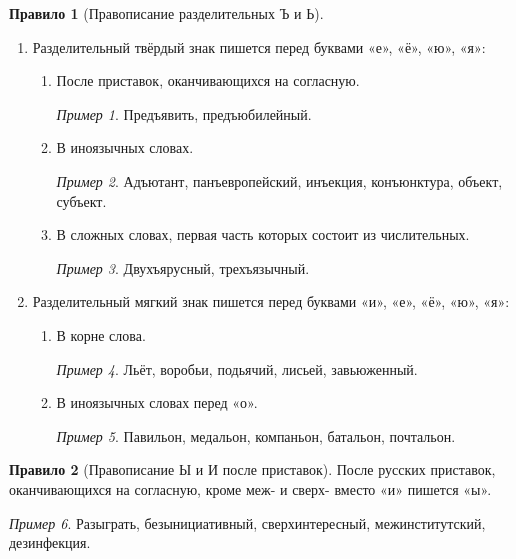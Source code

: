\documentclass[12pt]{article}
\theoremstyle{definition}
\newtheorem{rrule}{Правило}[section]
\theoremstyle{remark}
\newtheorem*{example}{Пример}
\begin{document}
\begin{rrule}[Правописание разделительных Ъ и Ь]
    \hfill
    \begin{enumerate}
        \item Разделительный твёрдый знак пишется перед буквами «е», «ё», «ю», «я»:
        \begin{enumerate}
            \item После приставок, оканчивающихся на согласную.
            \begin{example}
                Предъявить, предъюбилейный.
            \end{example}
            \item В иноязычных словах.
            \begin{example}
                Адъютант, панъевропейский, инъекция, конъюнктура, объект, субъект.
            \end{example}
            \item В сложных словах, первая часть которых состоит из числительных.
            \begin{example}
                Двухъярусный, трехъязычный.
            \end{example}
        \end{enumerate}
        \item Разделительный мягкий знак пишется перед буквами «и», «е», «ё», «ю», «я»:
        \begin{enumerate}
            \item В корне слова.
            \begin{example}
                Льёт, воробьи, подьячий, лисьей, завьюженный.
            \end{example}
            \item В иноязычных словах перед «о».
            \begin{example}
                Павильон, медальон, компаньон, батальон, почтальон.
            \end{example}
        \end{enumerate}
    \end{enumerate}
\end{rrule}

\begin{rrule}[Правописание Ы и И после приставок]
    После русских приставок, оканчивающихся на согласную, кроме меж- и сверх- вместо «и» пишется «ы».
    \begin{example}
        Разыграть, безынициативный, сверхинтересный, межинститутский, дезинфекция.
    \end{example}
\end{rrule}
\end{document}
